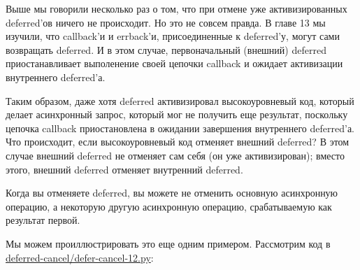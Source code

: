 
Выше мы говорили несколько раз о том, что при отмене 
уже активизированных deferred'ов ничего не происходит. 
Но это не совсем правда. В главе 13 мы изучили, что 
callback'и и errback'и, присоединенные к deferred'у, 
могут сами возвращать deferred. И в этом случае, первоначальный 
(внешний) deferred приостанавливает выполенение  своей 
цепочки callback и ожидает активизации внутреннего deferred'а.



Таким образом, даже хотя deferred активизировал 
высокоуровневый код, который делает асинхронный запрос, 
который мог не получить еще результат, поскольку цепочка 
callback приостановлена в ожидании завершения внутреннего 
deferred'а. Что происходит, если высокоуровневый код 
отменяет внешний deferred? В этом случае внешний deferred 
не отменяет сам себя (он уже активизирован); вместо этого, 
внешний deferred отменяет внутренний deferred.


Когда вы отменяете deferred, вы можете не отменить 
основную асинхронную операцию, а некоторую другую асинхронную 
операцию, срабатываемую как результат первой.

Мы можем проиллюстрировать это еще одним примером. 
Рассмотрим код в 
\href{http://github.com/jdavisp3/twisted-intro/blob/master/deferred-cancel/defer-cancel-12.py#L1}{deferred-cancel/defer-cancel-12.py}:

